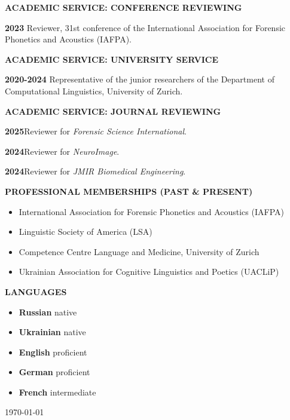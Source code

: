 \documentclass[11pt]{article}
\newcommand{\hangpara}{
 \setlength{\parindent}{0in} %
 \hangindent=0.42in %
}
\begin{document}
\vskip 20pt
\begin{flushleft}
{\bf ACADEMIC SERVICE: CONFERENCE REVIEWING}
\end{flushleft}
\hangpara
{\bf 2023}\hspace{1ex} Reviewer, 31st conference of the International Association for Forensic Phonetics and Acoustics (IAFPA).




\vskip 20pt
\begin{flushleft}
{\bf ACADEMIC SERVICE: UNIVERSITY SERVICE}
\end{flushleft}
\hangpara
{\bf 2020-2024}\hspace{1ex} Representative of the junior researchers of the Department of Computational Linguistics, University of Zurich.




\vskip 20pt
\begin{flushleft}
{\bf ACADEMIC SERVICE: JOURNAL REVIEWING}
\end{flushleft}
\hangpara
{\bf 2025}\hspace{1ex}Reviewer for \textit{Forensic Science International}.
\vskip 6pt
\hangpara
{\bf 2024}\hspace{1ex}Reviewer for \textit{NeuroImage}.
\vskip 6pt
\hangpara
{\bf 2024}\hspace{1ex}Reviewer for \textit{JMIR Biomedical Engineering}.



\vskip 20pt
\begin{flushleft}
{\bf PROFESSIONAL MEMBERSHIPS (PAST \& PRESENT)}
\end{flushleft}
\begin{itemize}
\item International Association for Forensic Phonetics and Acoustics (IAFPA)
\item Linguistic Society of America (LSA)
\item Competence Centre Language and Medicine, University of Zurich
\item Ukrainian Association for Cognitive Linguistics and Poetics (UACLiP)
\end{itemize}



\vskip 10pt
\begin{flushleft}
{\bf LANGUAGES}
\end{flushleft}
\begin{itemize}
\item {\bf Russian} native
\item {\bf Ukrainian} native
\item {\bf English} proficient
\item {\bf German} proficient
\item {\bf French} intermediate
\end{itemize}

\vskip 20pt
\today
\end{document}
